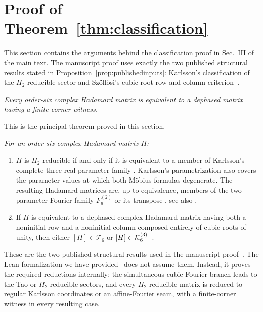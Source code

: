 \setcounter{tocdepth}{3}
\supplementaltableofcontents
\clearpage

\section{{Proof of Theorem~\ref{thm:classification}}}
\label{sec:supp-classification-proof}

{This section contains the arguments behind the classification proof in Sec.~III of the main text. The manuscript proof uses exactly the two published structural results stated in Proposition~\ref{prop:publishedinputs}: Karlsson's classification of the $H_2$-reducible sector and Sz\"oll\H{o}si's cubic-root row-and-column criterion~\cite{Karlsson2011H2,Karlsson2011ThreeParameter,Szollosi2012FourParameter}.}

{\emph{Every order-six complex Hadamard matrix is equivalent to a dephased matrix having a finite-corner witness.}}

{This is the principal theorem proved in this section.}

{\emph{For an order-six complex Hadamard matrix $H$:}}
\begin{enumerate}
\item {$H$ is $H_2$-reducible if and only if it is equivalent to a member of Karlsson's complete three-real-parameter family \cite{Karlsson2011H2,Karlsson2011ThreeParameter}. 
Karlsson's parametrization also covers the parameter values at which both
M\"obius formulas degenerate. The resulting Hadamard matrices are, up to equivalence, members of the two-parameter Fourier family $F_6^{(2)}$ or its transpose \cite[Secs.~4--5 and Theorem~11]{Karlsson2011ThreeParameter}, see also \cite[p.~623, Theorem~2.11]{Szollosi2012FourParameter}.}
\item {If $H$ is equivalent to a dephased complex Hadamard matrix having both a noninitial row and a noninitial column composed entirely of cubic roots of unity, then either $[H] \in \mathcal T_6$ or $[H]\in\mathcal K_6^{(3)}$~\cite[p.~624, Lemma~2.14]{Szollosi2012FourParameter}.}
\end{enumerate}
{These are the two published structural results used in the manuscript proof~\cite{Karlsson2011H2,Karlsson2011ThreeParameter,Szollosi2012FourParameter}. The Lean formalization we have provided~\cite{CardenesWuttig2026HadamardRepository} does not assume them. Instead, it proves the required reductions internally: the simultaneous cubic-Fourier branch leads to the Tao or $H_2$-reducible sectors, and every $H_2$-reducible matrix is reduced to regular Karlsson coordinates or an affine-Fourier seam, with a finite-corner witness in every resulting case.}

